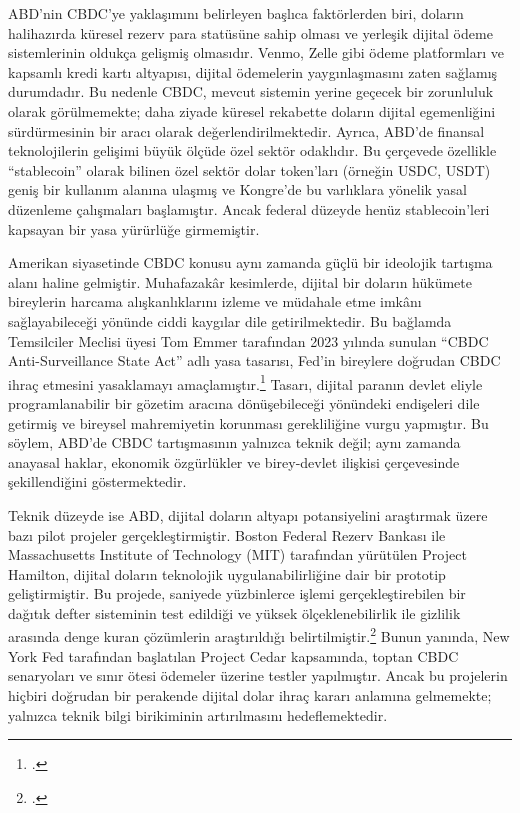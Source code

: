 \documentclass[a4paper,12pt]{article}
\begin{document}
ABD'nin CBDC'ye yaklaşımını belirleyen başlıca faktörlerden biri, doların halihazırda küresel rezerv para statüsüne sahip olması ve yerleşik dijital ödeme sistemlerinin oldukça gelişmiş olmasıdır. Venmo, Zelle gibi ödeme platformları ve kapsamlı kredi kartı altyapısı, dijital ödemelerin yaygınlaşmasını zaten sağlamış durumdadır. Bu nedenle CBDC, mevcut sistemin yerine geçecek bir zorunluluk olarak görülmemekte; daha ziyade küresel rekabette doların dijital egemenliğini sürdürmesinin bir aracı olarak değerlendirilmektedir. Ayrıca, ABD’de finansal teknolojilerin gelişimi büyük ölçüde özel sektör odaklıdır. Bu çerçevede özellikle “stablecoin” olarak bilinen özel sektör dolar token’ları (örneğin USDC, USDT) geniş bir kullanım alanına ulaşmış ve Kongre’de bu varlıklara yönelik yasal düzenleme çalışmaları başlamıştır. Ancak federal düzeyde henüz stablecoin’leri kapsayan bir yasa yürürlüğe girmemiştir.

Amerikan siyasetinde CBDC konusu aynı zamanda güçlü bir ideolojik tartışma alanı haline gelmiştir. Muhafazakâr kesimlerde, dijital bir doların hükümete bireylerin harcama alışkanlıklarını izleme ve müdahale etme imkânı sağlayabileceği yönünde ciddi kaygılar dile getirilmektedir. Bu bağlamda Temsilciler Meclisi üyesi Tom Emmer tarafından 2023 yılında sunulan “CBDC Anti-Surveillance State Act” adlı yasa tasarısı, Fed’in bireylere doğrudan CBDC ihraç etmesini yasaklamayı amaçlamıştır.\footcite{emmer2023cbdc} Tasarı, dijital paranın devlet eliyle programlanabilir bir gözetim aracına dönüşebileceği yönündeki endişeleri dile getirmiş ve bireysel mahremiyetin korunması gerekliliğine vurgu yapmıştır. Bu söylem, ABD’de CBDC tartışmasının yalnızca teknik değil; aynı zamanda anayasal haklar, ekonomik özgürlükler ve birey-devlet ilişkisi çerçevesinde şekillendiğini göstermektedir.

Teknik düzeyde ise ABD, dijital doların altyapı potansiyelini araştırmak üzere bazı pilot projeler gerçekleştirmiştir. Boston Federal Rezerv Bankası ile Massachusetts Institute of Technology (MIT) tarafından yürütülen Project Hamilton, dijital doların teknolojik uygulanabilirliğine dair bir prototip geliştirmiştir. Bu projede, saniyede yüzbinlerce işlemi gerçekleştirebilen bir dağıtık defter sisteminin test edildiği ve yüksek ölçeklenebilirlik ile gizlilik arasında denge kuran çözümlerin araştırıldığı belirtilmiştir.\footcite{hamilton2022project} Bunun yanında, New York Fed tarafından başlatılan Project Cedar kapsamında, toptan CBDC senaryoları ve sınır ötesi ödemeler üzerine testler yapılmıştır. Ancak bu projelerin hiçbiri doğrudan bir perakende dijital dolar ihraç kararı anlamına gelmemekte; yalnızca teknik bilgi birikiminin artırılmasını hedeflemektedir.
\end{document}
